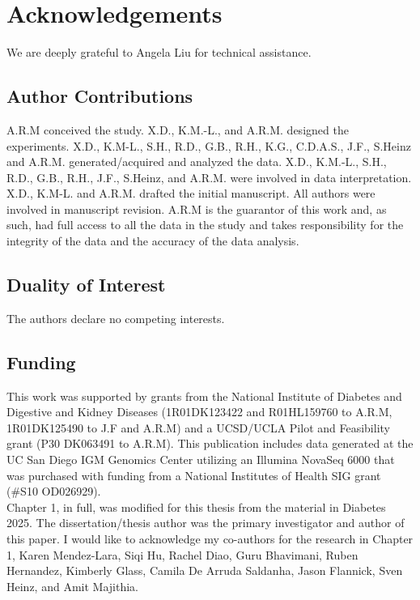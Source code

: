 \section{Acknowledgements}

We are deeply grateful to Angela Liu for technical assistance. 
 
\subsection{Author Contributions}
A.R.M conceived the study. X.D., K.M.-L., and A.R.M. designed the experiments. X.D., K.M-L., S.H., R.D., G.B., R.H., K.G., C.D.A.S., J.F., S.Heinz and A.R.M. generated/acquired and analyzed the data. X.D., K.M.-L., S.H., R.D., G.B., R.H., J.F., S.Heinz, and A.R.M. were involved in data interpretation. X.D., K.M-L. and A.R.M. drafted the initial manuscript. All authors were involved in manuscript revision. A.R.M is the guarantor of this work and, as such, had full access to all the data in the study and takes responsibility for the integrity of the data and the accuracy of the data analysis.

\subsection{Duality of Interest}
The authors declare no competing interests.  

\subsection{Funding}
This work was supported by grants from the National Institute of Diabetes and Digestive and Kidney Diseases (1R01DK123422 and R01HL159760 to A.R.M, 1R01DK125490 to J.F and A.R.M) and a UCSD/UCLA Pilot and Feasibility grant (P30 DK063491 to A.R.M). This publication includes data generated at the UC San Diego IGM Genomics Center utilizing an Illumina NovaSeq 6000 that was purchased with funding from a National Institutes of Health SIG grant (\#S10 OD026929).\\ 

\noindent Chapter 1, in full, was modified for this thesis from the material in Diabetes 2025. The dissertation/thesis author was the primary investigator and author of this paper. I would like to acknowledge my co-authors for the research in Chapter 1, Karen Mendez-Lara, Siqi Hu, Rachel Diao, Guru Bhavimani, Ruben Hernandez, Kimberly Glass, Camila De Arruda Saldanha, Jason Flannick, Sven Heinz, and Amit Majithia.



